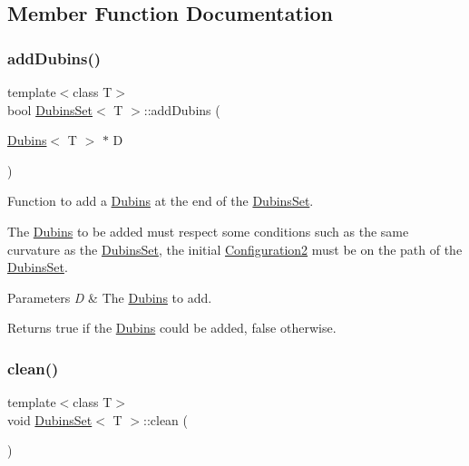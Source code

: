 \subsection{Member Function Documentation}
\mbox{\label{class_dubins_set_a7a86238ae8e2c86280bbb4e2b47f01a0}} 
\subsubsection{\texorpdfstring{addDubins()}{addDubins()}}
{\footnotesize\ttfamily template$<$class T$>$ \\
bool \mbox{\hyperlink{class_dubins_set}{Dubins\+Set}}$<$ T $>$\+::add\+Dubins (\begin{DoxyParamCaption}\item[{\mbox{\hyperlink{class_dubins}{Dubins}}$<$ T $>$ $\ast$}]{D }\end{DoxyParamCaption})\hspace{0.3cm}{\ttfamily [inline]}}



Function to add a {\ttfamily \mbox{\hyperlink{class_dubins}{Dubins}}} at the end of the {\ttfamily \mbox{\hyperlink{class_dubins_set}{Dubins\+Set}}}. 

The {\ttfamily \mbox{\hyperlink{class_dubins}{Dubins}}} to be added must respect some conditions such as the same curvature as the {\ttfamily \mbox{\hyperlink{class_dubins_set}{Dubins\+Set}}}, the initial {\ttfamily \mbox{\hyperlink{class_configuration2}{Configuration2}}} must be on the path of the {\ttfamily \mbox{\hyperlink{class_dubins_set}{Dubins\+Set}}}. 
\begin{DoxyParams}{Parameters}
{\em D} & The {\ttfamily \mbox{\hyperlink{class_dubins}{Dubins}}} to add. \\
\hline
\end{DoxyParams}
\begin{DoxyReturn}{Returns}
{\ttfamily true} if the {\ttfamily \mbox{\hyperlink{class_dubins}{Dubins}}} could be added, {\ttfamily false} otherwise. 
\end{DoxyReturn}
\mbox{\label{class_dubins_set_ac10e53aa7e66448de77371a047801fc6}} 
\subsubsection{\texorpdfstring{clean()}{clean()}}
{\footnotesize\ttfamily template$<$class T$>$ \\
void \mbox{\hyperlink{class_dubins_set}{Dubins\+Set}}$<$ T $>$\+::clean (\begin{DoxyParamCaption}{ }\end{DoxyParamCaption})\hspace{0.3cm}{\ttfamily [inline]}}

